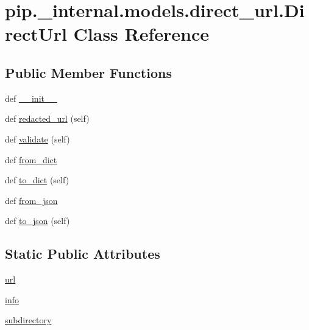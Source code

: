 \hypertarget{classpip_1_1__internal_1_1models_1_1direct__url_1_1DirectUrl}{}\section{pip.\+\_\+internal.\+models.\+direct\+\_\+url.\+Direct\+Url Class Reference}
\label{classpip_1_1__internal_1_1models_1_1direct__url_1_1DirectUrl}
\subsection*{Public Member Functions}
\begin{DoxyCompactItemize}
\item 
def \hyperlink{classpip_1_1__internal_1_1models_1_1direct__url_1_1DirectUrl_afc3ec5d6362ffd4a62d6df995a7ac97b}{\+\_\+\+\_\+init\+\_\+\+\_\+}
\item 
def \hyperlink{classpip_1_1__internal_1_1models_1_1direct__url_1_1DirectUrl_afe75eb9adeeac840f77d2982a895860a}{redacted\+\_\+url} (self)
\item 
def \hyperlink{classpip_1_1__internal_1_1models_1_1direct__url_1_1DirectUrl_aa6e9318eea1a6d693b2906e0a73797a4}{validate} (self)
\item 
def \hyperlink{classpip_1_1__internal_1_1models_1_1direct__url_1_1DirectUrl_aef1f20324797d04d17bb8d9bd72cba78}{from\+\_\+dict}
\item 
def \hyperlink{classpip_1_1__internal_1_1models_1_1direct__url_1_1DirectUrl_a804f230f170ace2442b8ff4c99473a7f}{to\+\_\+dict} (self)
\item 
def \hyperlink{classpip_1_1__internal_1_1models_1_1direct__url_1_1DirectUrl_aa77fcbf0ec4714a3bd3eab3db65d16e5}{from\+\_\+json}
\item 
def \hyperlink{classpip_1_1__internal_1_1models_1_1direct__url_1_1DirectUrl_ad7b5d3198af70dca8098be3f7519cfdf}{to\+\_\+json} (self)
\end{DoxyCompactItemize}
\subsection*{Static Public Attributes}
\begin{DoxyCompactItemize}
\item 
\hyperlink{classpip_1_1__internal_1_1models_1_1direct__url_1_1DirectUrl_af3daefac8a753a5dfc2e24291da9bc46}{url}
\item 
\hyperlink{classpip_1_1__internal_1_1models_1_1direct__url_1_1DirectUrl_a6683787d84ccd7333752a33a0d2ec6da}{info}
\item 
\hyperlink{classpip_1_1__internal_1_1models_1_1direct__url_1_1DirectUrl_a1c2fc70919259b219121a1b3f255a5a1}{subdirectory}
\end{DoxyCompactItemize}


